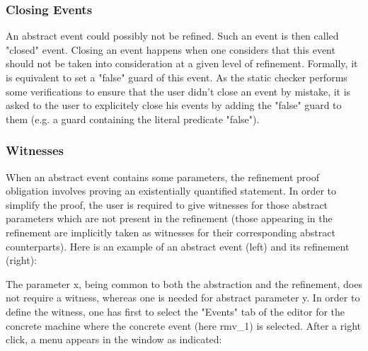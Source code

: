 \subsubsection{Closing Events}

An abstract event could possibly not be refined. Such an event is then called "closed" event. Closing an event happens when one considers that this event should not be taken into consideration at a given level of refinement. Formally, it is equivalent to set a "false" guard of this event. As the static checker performs some verifications to ensure that the user didn't close an event by mistake, it is asked to the user to explicitely close his events by adding the "false" guard to them (e.g. a guard containing the literal predicate "false").

\subsubsection{Witnesses}

When an abstract event contains some parameters, the refinement proof obligation involves proving an existentially quantified statement. In order to simplify the proof, the user is required to give witnesses for those abstract parameters which are not present in the refinement (those appearing in the refinement are implicitly taken as witnesses for their corresponding abstract counterparts). Here is an example of an abstract event (left) and its refinement (right): 



The parameter x, being common to both the abstraction and the refinement, does not require a witness, whereas one is needed for abstract parameter y. In order to define the witness, one has first to select the "Events" tab of the editor for the concrete machine where the concrete event (here rmv\_1) is selected. After a right click, a menu appears in the window as indicated:


